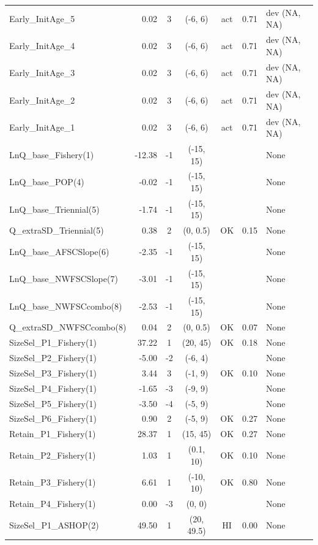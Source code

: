 \documentclass[12pt,]{article}
\begin{document}
\begin{landscape}
\begin{longtable}{lrcccll}
  Early\_InitAge\_5 & 0.02 & 3 & (-6, 6) & act & 0.71 & dev (NA, NA) \\ 
  Early\_InitAge\_4 & 0.02 & 3 & (-6, 6) & act & 0.71 & dev (NA, NA) \\ 
  Early\_InitAge\_3 & 0.02 & 3 & (-6, 6) & act & 0.71 & dev (NA, NA) \\ 
  Early\_InitAge\_2 & 0.02 & 3 & (-6, 6) & act & 0.71 & dev (NA, NA) \\ 
  Early\_InitAge\_1 & 0.02 & 3 & (-6, 6) & act & 0.71 & dev (NA, NA) \\ 
  LnQ\_base\_Fishery(1) & -12.38 & -1 & (-15, 15) &  &  & None \\ 
  LnQ\_base\_POP(4) & -0.02 & -1 & (-15, 15) &  &  & None \\ 
  LnQ\_base\_Triennial(5) & -1.74 & -1 & (-15, 15) &  &  & None \\ 
  Q\_extraSD\_Triennial(5) & 0.38 & 2 & (0, 0.5) & OK & 0.15 & None \\ 
  LnQ\_base\_AFSCSlope(6) & -2.35 & -1 & (-15, 15) &  &  & None \\ 
  LnQ\_base\_NWFSCSlope(7) & -3.01 & -1 & (-15, 15) &  &  & None \\ 
  LnQ\_base\_NWFSCcombo(8) & -2.53 & -1 & (-15, 15) &  &  & None \\ 
  Q\_extraSD\_NWFSCcombo(8) & 0.04 & 2 & (0, 0.5) & OK & 0.07 & None \\ 
  SizeSel\_P1\_Fishery(1) & 37.22 & 1 & (20, 45) & OK & 0.18 & None \\ 
  SizeSel\_P2\_Fishery(1) & -5.00 & -2 & (-6, 4) &  &  & None \\ 
  SizeSel\_P3\_Fishery(1) & 3.44 & 3 & (-1, 9) & OK & 0.10 & None \\ 
  SizeSel\_P4\_Fishery(1) & -1.65 & -3 & (-9, 9) &  &  & None \\ 
  SizeSel\_P5\_Fishery(1) & -3.50 & -4 & (-5, 9) &  &  & None \\ 
  SizeSel\_P6\_Fishery(1) & 0.90 & 2 & (-5, 9) & OK & 0.27 & None \\ 
  Retain\_P1\_Fishery(1) & 28.37 & 1 & (15, 45) & OK & 0.27 & None \\ 
  Retain\_P2\_Fishery(1) & 1.03 & 1 & (0.1, 10) & OK & 0.10 & None \\ 
  Retain\_P3\_Fishery(1) & 6.61 & 1 & (-10, 10) & OK & 0.80 & None \\ 
  Retain\_P4\_Fishery(1) & 0.00 & -3 & (0, 0) &  &  & None \\ 
  SizeSel\_P1\_ASHOP(2) & 49.50 & 1 & (20, 49.5) & HI & 0.00 & None \\ 

\end{longtable}
\end{landscape}
\end{document}
